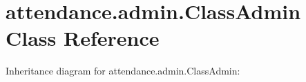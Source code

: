 \hypertarget{classattendance_1_1admin_1_1_class_admin}{}\section{attendance.\+admin.\+Class\+Admin Class Reference}
\label{classattendance_1_1admin_1_1_class_admin}


Inheritance diagram for attendance.\+admin.\+Class\+Admin\+:
